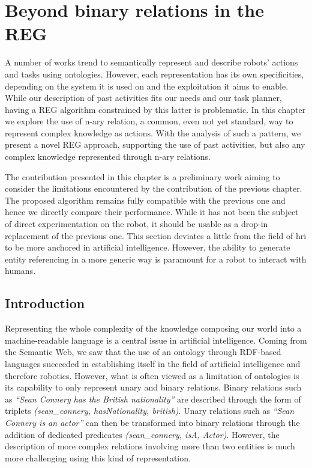 \ifdefined{}
\else
\setcounter{chapter}{7} %
\dominitoc
\faketableofcontents
\fi

\chapter{Beyond binary relations in the REG}
\minitoc
\label{chap:7}

A number of works trend to semantically represent and describe robots' actions and tasks using ontologies. However, each representation has its own specificities, depending on the system it is used on and the exploitation it aims to enable. While our description of past activities fits our needs and our task planner, having a REG algorithm constrained by this latter is problematic. In this chapter we explore the use of n-ary relation, a common, even not yet standard, way to represent complex knowledge as actions. With the analysis of such a pattern, we present a novel REG approach, supporting the use of past activities, but also any complex knowledge represented through n-ary relations.

The contribution presented in this chapter is a preliminary work aiming to consider the limitations encountered by the contribution of the previous chapter. The proposed algorithm remains fully compatible with the previous one and hence we directly compare their performance. While it has not been the subject of direct experimentation on the robot, it should be usable as a drop-in replacement of the previous one. This section deviates a little from the field of \acrshort{hri} to be more anchored in artificial intelligence. However, the ability to generate entity referencing in a more generic way is paramount for a robot to interact with humans. 

\section{Introduction}

Representing the whole complexity of the knowledge composing our world into a machine-readable language is a central issue in artificial intelligence. Coming from the Semantic Web, we saw that the use of an ontology through RDF-based languages succeeded in establishing itself in the field of artificial intelligence and therefore robotics. However, what is often viewed as a limitation of ontologies is its capability to only represent unary and binary relations. Binary relations such as \textit{``Sean Connery has the British nationality''} are described through the form of triplets \textit{(sean\_connery, hasNationality, british)}. Unary relations such as \textit{``Sean Connery is an actor''} can then be transformed into binary relations through the addition of dedicated predicates \textit{(sean\_connery, isA, Actor)}. However, the description of more complex relations involving more than two entities is much more challenging using this kind of representation.

